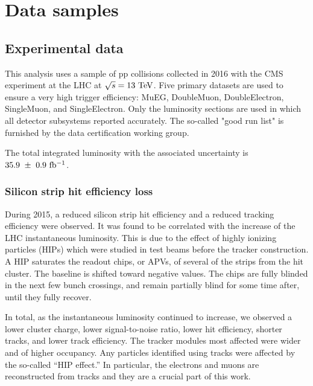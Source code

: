 \chapter{Data samples}
\section{Experimental data}
This analysis uses a sample of pp collisions collected in 2016 with the CMS 
experiment at the LHC at $\sqrt{s} = 13~\rm{TeV}$. Five primary datasets  
are used to ensure a very high trigger efficiency: MuEG, DoubleMuon, 
DoubleElectron, SingleMuon, and SingleElectron.
Only the luminosity sections are used in which all detector subsystems reported accurately.
The so-called "good run list" is furnished by the data certification working group.


The total integrated luminosity with the associated uncertainty is $35.9~\pm~0.9~\mathrm{fb^{-1}}$.

\subsection{Silicon strip hit efficiency loss}
\label{ss:hips}
During 2015, a reduced silicon strip hit efficiency and a reduced tracking efficiency were observed.
It was found to be correlated with the increase of the LHC instantaneous luminosity.
This is due to the effect of highly ionizing particles (HIPs) which were studied in test beams
before the tracker construction. A HIP saturates the readout chips, or APVs, of several of the strips from the hit cluster. 
The baseline is shifted toward negative values.
The chips are fully blinded in the next few bunch crossings, and remain partially blind for some time after, until they fully recover.

In total, as the instantaneous luminosity continued to increase, we observed a lower cluster charge, lower signal-to-noise ratio, lower hit efficiency, shorter tracks, and lower track efficiency.
The tracker modules most affected were wider and of higher occupancy. %
Any particles identified using tracks were affected by the so-called ``HIP effect.''
In particular, the electrons and muons are reconstructed from tracks and they are a crucial part of this work.

